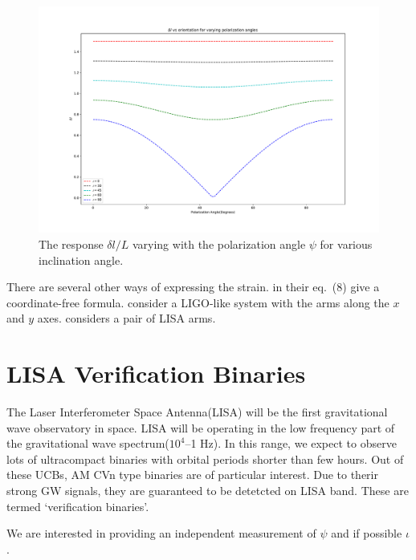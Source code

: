 \documentclass[10pt,a4paper]{article}
\begin{document}
\begin{figure}[!h]
\centering
\includegraphics[scale=0.3]{../Figures/responsevsorientationofbinary.pdf}
\caption{The response $\delta l/L$ varying with the polarization
  angle $\psi$ for various inclination angle.\label{fig:resporient}}
\end{figure}

There are several other ways of expressing the strain.  \cite{cornish}
in their eq.~(8) give a coordinate-free formula.  \cite{ACST}
consider a LIGO-like system with the arms along the $x$ and $y$ axes.
\cite{cutler} considers a pair of LISA arms.
 
\newpage
\section{LISA Verification Binaries}

The Laser Interferometer Space Antenna(LISA) will be the first gravitational wave observatory in space. LISA will be operating in the low frequency part of the gravitational wave spectrum($10^4$--1 Hz). In this range, we expect to observe lots of ultracompact binaries with orbital periods shorter than few hours. Out of these UCBs, AM CVn type binaries are of particular interest. Due to therir strong GW signals, they are guaranteed to be  detetcted on LISA band. These are termed `verification binaries'.

We are interested in providing an independent measurement of $\psi$ and if possible $\iota$.
\end{document}
